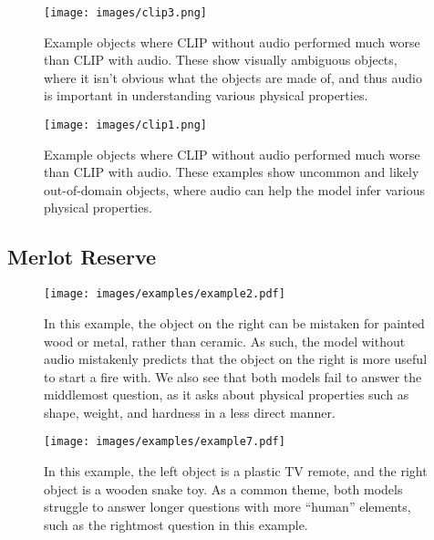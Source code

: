 \documentclass[runningheads]{llncs}
\begin{document}
\begin{figure}[t]
    \centering
  \texttt{[image: images/clip3.png]}
  \caption{Example objects where CLIP without audio performed much worse than CLIP with audio. These show visually ambiguous objects, where it isn't obvious what the objects are made of, and thus audio is important in understanding various physical properties.}
  \label{fig:clip_ambiguous}
\end{figure}
\begin{figure}[t]
    \centering
  \texttt{[image: images/clip1.png]}
  \caption{Example objects where CLIP without audio performed much worse than CLIP with audio. These examples show uncommon and likely out-of-domain objects, where audio can help the model infer various physical properties. }
  \label{fig:clip_uncommon}
\end{figure}

\clearpage

\subsection{Merlot Reserve}



\begin{figure}[t!]
    \centering
  \texttt{[image: images/examples/example2.pdf]}
  \vspace*{-7mm}
  \caption{In this example, the object on the right can be mistaken for painted wood or metal, rather than ceramic. As such, the model without audio mistakenly predicts that the object on the right is more useful to start a fire with. We also see that both models fail to answer the middlemost question, as it asks about physical properties such as shape, weight, and hardness in a less direct manner.}
  \label{fig:example2}
  \vspace{-2mm}
\end{figure}

\begin{figure}[t!]
    \centering
  \texttt{[image: images/examples/example7.pdf]}
  \vspace*{-7mm}
  \caption{ In this example, the left object is a plastic TV remote, and the right object is a wooden snake toy. As a common theme, both models struggle to answer longer questions with more ``human'' elements, such as the rightmost question in this example.}
  \label{fig:example7}
  \vspace{-5mm}
\end{figure}
\end{document}
